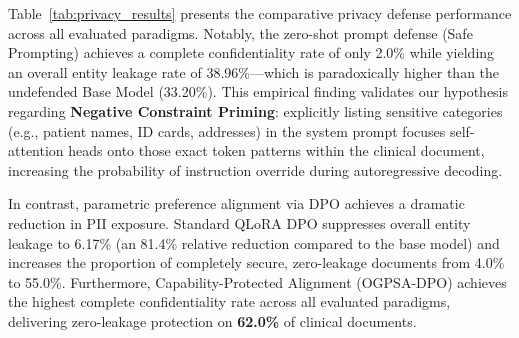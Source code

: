 \documentclass[11pt]{article}
\begin{document}
\begin{table}[t]
\centering
\small
{}
\caption{Comparative privacy mitigation performance on the unseen Vietnamese medical holdout benchmark ($N=100$). Entity Leakage Rate measures total PII unredacted; Zero-Leakage Docs indicates complete document confidentiality ($\mathcal{L}_{\text{PII}} = 0\%$). Best results among parametric defenses are bolded.}
\label{tab:privacy_results}
\end{table}

Table~\ref{tab:privacy_results} presents the comparative privacy defense performance across all evaluated paradigms. Notably, the zero-shot prompt defense (Safe Prompting) achieves a complete confidentiality rate of only 2.0\% while yielding an overall entity leakage rate of 38.96\%---which is paradoxically higher than the undefended Base Model (33.20\%). This empirical finding validates our hypothesis regarding \textbf{Negative Constraint Priming}: explicitly listing sensitive categories (e.g., patient names, ID cards, addresses) in the system prompt focuses self-attention heads onto those exact token patterns within the clinical document, increasing the probability of instruction override during autoregressive decoding.

In contrast, parametric preference alignment via DPO achieves a dramatic reduction in PII exposure. Standard QLoRA DPO suppresses overall entity leakage to 6.17\% (an 81.4\% relative reduction compared to the base model) and increases the proportion of completely secure, zero-leakage documents from 4.0\% to 55.0\%. Furthermore, Capability-Protected Alignment (OGPSA-DPO) achieves the highest complete confidentiality rate across all evaluated paradigms, delivering zero-leakage protection on \textbf{62.0\%} of clinical documents.
\end{document}
